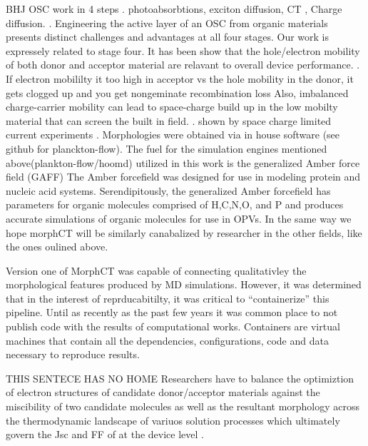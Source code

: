 BHJ OSC work in 4 steps . photoabsorbtions, exciton diffusion, CT , Charge diffusion. \citet{Fusella2019}.
Engineering the active layer of an OSC from organic materials presents distinct challenges and advantages at
all four stages. 
\indent Our work is expressely related to stage four. It has been show that the hole/electron mobility of both donor and acceptor material are
relavant to overall device performance. \cite{Wang2019e}. If electron mobililty it too high
in acceptor vs the hole mobility in the donor, it gets clogged up and you get nongeminate recombination loss
Also, imbalanced charge-carrier mobility can lead to space-charge build up in the low mobilty material that
can screen the built in field.  \cite{Bartelt2015}. shown by space charge limited current experiments
\cite{Small2013}.
Morphologies were obtained via in house software (see github for planckton-flow).  The
fuel for the simulation engines mentioned above(plankton-flow/hoomd) utilized in this work is the generalized
Amber force field (GAFF)\cite{Wang2004a} The Amber forcefield was designed for use in modeling protein and
nucleic acid systems.  Serendipitously, the generalized Amber forcefield has parameters for organic molecules
comprised of H,C,N,O, and P and produces accurate simulations of organic molecules for use in OPVs. In the
same way we hope morphCT will be similarly canabalized by researcher in the other fields, like the ones oulined above. 


Version one of MorphCT was capable of
connecting qualitativley the morphological features produced by MD simulations. However, it was determined
that in the interest of reprducabitilty, it was critical to ``containerize'' this pipeline. Until as recently as
the past few years it was common place to not publish code with the results of computational works. Containers
are virtual machines that contain all the dependencies, configurations, code and data necessary to reproduce
results. \cite{Cito2016a}

THIS SENTECE HAS NO HOME Researchers have to
balance the optimiztion of electron structures of candidate donor/acceptor materials against the miscibility
of two candidate molecules as well as the resultant morphology across the thermodynamic landscape of
variuos solution processes which ultimately govern the Jsc and FF of at the device level \cite{Zhu2020a}. 
